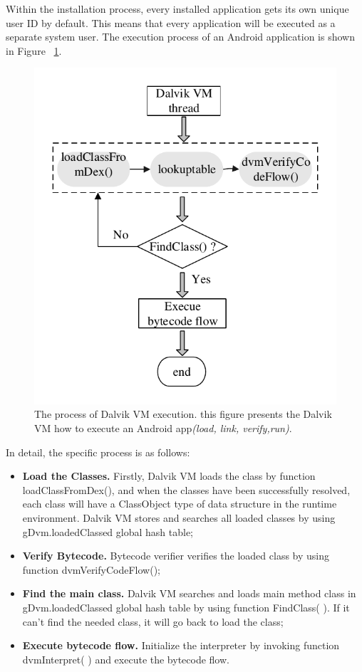 Within the installation process, every installed application gets its own unique user ID by default. This means that every application will be executed as a separate system user. The execution process\cite{08} of an Android application is shown in Figure ~\ref{fig:Figure 3}.

\begin{figure}[!tbp]
  \centering
  \includegraphics[width=0.8\columnwidth]{fig/fig3.pdf}
  \caption{The process of Dalvik VM execution. this figure presents the Dalvik VM how to execute an Android app\emph{(load, link, verify,run)}.}\label{fig:Figure 3}
\end{figure}


In detail, the specific process is as follows:
\begin{itemize}
  \item \textbf{Load the Classes.} Firstly, Dalvik VM loads the class by function loadClassFromDex(), and when the classes have been successfully resolved, each class will have a ClassObject type of data structure in the runtime environment. Dalvik VM stores and searches all loaded classes by using gDvm.loadedClassed global hash table;
  \item \textbf{Verify Bytecode.} Bytecode verifier verifies the loaded class by using function dvmVerifyCodeFlow();
  \item \textbf{Find the main class.} Dalvik VM searches and loads main method class in gDvm.loadedClassed global hash table by using function FindClass( ). If it can't find the needed class, it will go back to load the class;
  \item \textbf{Execute bytecode flow.} Initialize the interpreter by invoking function dvmInterpret( ) and execute the bytecode flow.
\end{itemize}



